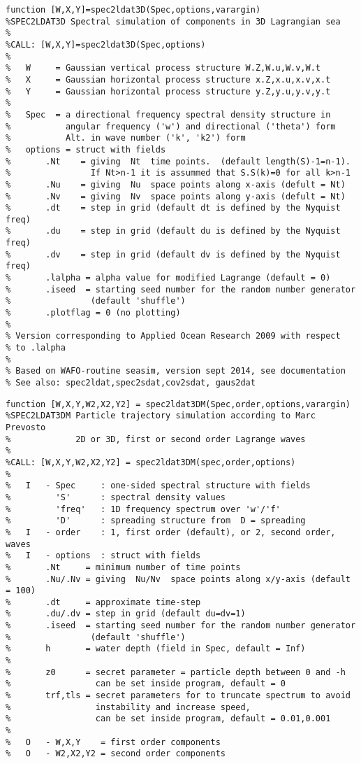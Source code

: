 {\begin{verbatim}
function [W,X,Y]=spec2ldat3D(Spec,options,varargin)
%SPEC2LDAT3D Spectral simulation of components in 3D Lagrangian sea 
%
%CALL: [W,X,Y]=spec2ldat3D(Spec,options)
%
%   W     = Gaussian vertical process structure W.Z,W.u,W.v,W.t
%   X     = Gaussian horizontal process structure x.Z,x.u,x.v,x.t
%   Y     = Gaussian horizontal process structure y.Z,y.u,y.v,y.t
%
%   Spec  = a directional frequency spectral density structure in 
%           angular frequency ('w') and directional ('theta') form
%           Alt. in wave number ('k', 'k2') form
%   options = struct with fields 
%       .Nt    = giving  Nt  time points.  (default length(S)-1=n-1).
%                If Nt>n-1 it is assummed that S.S(k)=0 for all k>n-1
%       .Nu    = giving  Nu  space points along x-axis (defult = Nt)
%       .Nv    = giving  Nv  space points along y-axis (defult = Nt)
%       .dt    = step in grid (default dt is defined by the Nyquist freq) 
%       .du    = step in grid (default du is defined by the Nyquist freq)
%       .dv    = step in grid (default dv is defined by the Nyquist freq)
%       .lalpha = alpha value for modified Lagrange (default = 0)
%       .iseed  = starting seed number for the random number generator 
%                (default 'shuffle')
%       .plotflag = 0 (no plotting)
%
% Version corresponding to Applied Ocean Research 2009 with respect 
% to .lalpha 
%
% Based on WAFO-routine seasim, version sept 2014, see documentation
% See also: spec2ldat,spec2sdat,cov2sdat, gaus2dat
\end{verbatim}
\clearpage

\begin{verbatim}
function [W,X,Y,W2,X2,Y2] = spec2ldat3DM(Spec,order,options,varargin)
%SPEC2LDAT3DM Particle trajectory simulation according to Marc Prevosto
%             2D or 3D, first or second order Lagrange waves
%
%CALL: [W,X,Y,W2,X2,Y2] = spec2ldat3DM(spec,order,options) 
%
%   I   - Spec     : one-sided spectral structure with fields 
%         'S'      : spectral density values
%         'freq'   : 1D frequency spectrum over 'w'/'f'
%         'D'      : spreading structure from  D = spreading
%   I   - order    : 1, first order (default), or 2, second order, waves 
%   I   - options  : struct with fields 
%       .Nt     = minimum number of time points
%       .Nu/.Nv = giving  Nu/Nv  space points along x/y-axis (default = 100)
%       .dt     = approximate time-step  
%       .du/.dv = step in grid (default du=dv=1)
%       .iseed  = starting seed number for the random number generator 
%                (default 'shuffle')
%       h       = water depth (field in Spec, default = Inf)
%
%       z0      = secret parameter = particle depth between 0 and -h
%                 can be set inside program, default = 0
%       trf,tls = secret parameters for to truncate spectrum to avoid 
%                 instability and increase speed, 
%                 can be set inside program, default = 0.01,0.001
%
%   O   - W,X,Y    = first order components
%   O   - W2,X2,Y2 = second order components
\end{verbatim}
\clearpage

}
